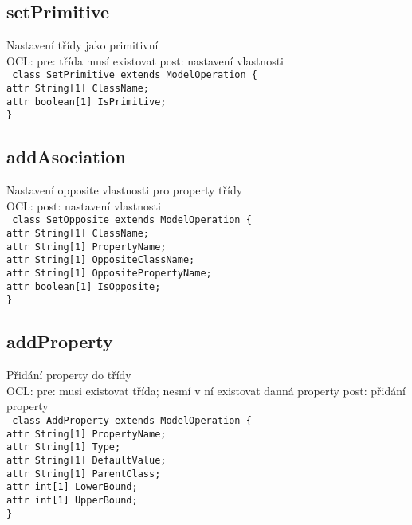 \documentclass[11pt,a4paper]{article}
\begin{document}
	\subsection{setPrimitive}
	Nastavení třídy jako primitivní \\
	OCL: pre: třída musí existovat post: nastavení vlastnosti \\
	\texttt{
    class SetPrimitive extends ModelOperation \{\\
      attr String[1] ClassName;\\
      attr boolean[1] IsPrimitive;\\
    \}
	}
	\subsection{addAsociation}
	Nastavení opposite vlastnosti pro property třídy \\
	OCL: post: nastavení vlastnosti \\
	\texttt{
    class SetOpposite extends ModelOperation \{\\
      attr String[1] ClassName;\\
      attr String[1] PropertyName;\\
      attr String[1] OppositeClassName;\\
      attr String[1] OppositePropertyName;\\
      attr boolean[1] IsOpposite;\\
    \}
	}
	\subsection{addProperty}
	Přidání property do třídy \\
	OCL: pre: musi existovat třída; nesmí v ní existovat danná property post: přidání property \\
	\texttt{
    class AddProperty extends ModelOperation \{\\
      attr String[1] PropertyName;\\
      attr String[1] Type;\\
      attr String[1] DefaultValue;\\
      attr String[1] ParentClass;\\
      attr int[1] LowerBound;\\
      attr int[1] UpperBound;\\
    \}
	}			
\end{document}
